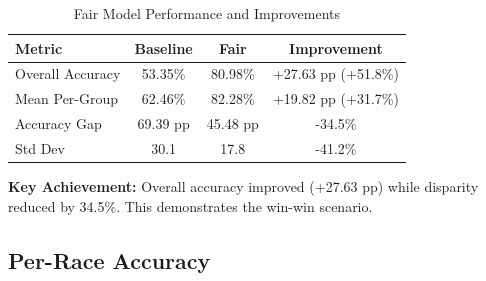 \documentclass[11pt,a4paper,oneside]{report}
\begin{document}
\begin{table}[h]

\centering

\caption{Fair Model Performance and Improvements}

\begin{tabular}{|l|c|c|c|}

\hline

\textbf{Metric} & \textbf{Baseline} & \textbf{Fair} & \textbf{Improvement} \\

\hline

Overall Accuracy & 53.35\% & 80.98\% & +27.63 pp (+51.8\%) \\

\hline

Mean Per-Group & 62.46\% & 82.28\% & +19.82 pp (+31.7\%) \\

\hline

Accuracy Gap & 69.39 pp & 45.48 pp & -34.5\% \\

\hline

Std Dev & 30.1 & 17.8 & -41.2\% \\

\hline

\end{tabular}

\end{table}

\textbf{Key Achievement:} Overall accuracy improved (+27.63 pp) while disparity reduced by 34.5\%. This demonstrates the win-win scenario.

\subsection{Per-Race Accuracy}
\end{document}
